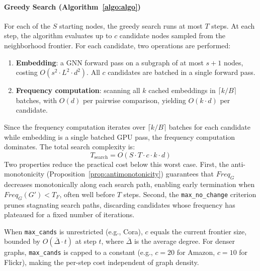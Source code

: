 \documentclass[pdflatex,sn-mathphys-num]{sn-jnl}%
\theoremstyle{thmstyleone}%
\theoremstyle{thmstyletwo}%
\theoremstyle{thmstylethree}%
\begin{document}
{\paragraph{Greedy Search (Algorithm~\ref{algo:algo})}
For each of the $S$ starting nodes, the greedy search runs at most $T$ steps. At each step, the algorithm evaluates up to $c$ candidate nodes sampled from the neighborhood frontier. For each candidate, two operations are performed:

\begin{enumerate}
    \item \textbf{Embedding}: a GNN forward pass on a subgraph of at most $s{+}1$ nodes, costing $O(s^2 \cdot L^2 \cdot d^2)$. All $c$ candidates are batched in a single forward pass.
    \item \textbf{Frequency computation}: scanning all $k$ cached embeddings in $\lceil k/B \rceil$ batches, with $O(d)$ per pairwise comparison, yielding $O(k \cdot d)$ per candidate.
\end{enumerate}
Since the frequency computation iterates over $\lceil k/B \rceil$ batches for each candidate while embedding is a single batched GPU pass, the frequency computation dominates. The total search complexity is:
\begin{equation}
\label{eq:search_complexity}
T_{\text{search}} = O(S \cdot T \cdot c \cdot k \cdot d)
\end{equation}
Two properties reduce the practical cost below this worst case. First, the anti-monotonicity (Proposition~\ref{prop:antimonotonicity}) guarantees that $Freq_G$ decreases monotonically along each search path, enabling early termination when $Freq_G(G') < T_F$, often well before $T$ steps. Second, the \texttt{max\_no\_change} criterion prunes stagnating search paths, discarding candidates whose frequency has plateaued for a fixed number of iterations.

When \texttt{max\_cands} is unrestricted (e.g., Cora), $c$ equals the current frontier size, bounded by $O(\bar{\Delta} \cdot t)$ at step $t$, where $\bar{\Delta}$ is the average degree. For denser graphs, \texttt{max\_cands} is capped to a constant (e.g., $c = 20$ for Amazon, $c = 10$ for Flickr), making the per-step cost independent of graph density.

}
\end{document}
